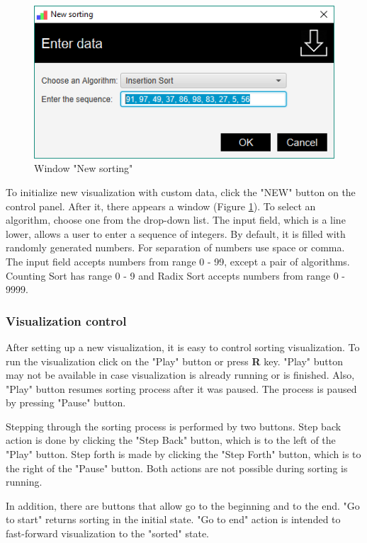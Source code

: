 \documentclass[
  field=inf,
  biblatex,
  language=english,
  glossaries,
  theorems=false,
  sourcecodes=false,
  index
]{kidiplom}
\begin{document}
\begin{figure}[H]
\begin{center}
	\includegraphics[scale=0.5]{img/ui/WindowNew.png}
	\caption{Window "New sorting"}\label{fig:new}
\end{center}
\end{figure}

To initialize new visualization with custom data, click the "NEW" button on the control panel. After it, there appears a window (Figure \ref{fig:new}). To select an algorithm, choose one from the drop-down list. The input field, which is a line lower, allows a user to enter a sequence of integers. By default, it is filled with randomly generated numbers. For separation of numbers use space or comma. The input field accepts numbers from range 0 - 99, except a pair of algorithms. Counting Sort has range 0 - 9 and Radix Sort accepts numbers from range 0 - 9999. 

\subsubsection{Visualization control}

After setting up a new visualization, it is easy to control sorting visualization. To run the visualization click on the "Play" button or press \textbf{R} key. "Play" button may not be available in case visualization is already running or is finished. Also, "Play" button resumes sorting process after it was paused. The process is paused by pressing "Pause" button.

Stepping through the sorting process is performed by two buttons. Step back action is done by clicking the "Step Back" button, which is to the left of the "Play" button. Step forth is made by clicking the "Step Forth" button, which is to the right of the "Pause" button. Both actions are not possible during sorting is running.

In addition, there are buttons that allow go to the beginning and to the end. "Go to start" returns sorting in the initial state. "Go to end" action is intended to fast-forward visualization to the "sorted" state.
\end{document}
